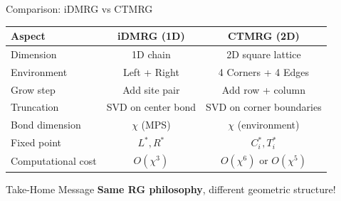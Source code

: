 \documentclass[aspectratio=169, 11pt]{beamer}
\newcommand{\goodpoint}[1]{\textcolor{accentgreen}{\textbf{#1}}}
\begin{document}

\begin{frame}{Comparison: iDMRG vs CTMRG}
	
	\begin{table}
		\centering
		\renewcommand{\arraystretch}{1.3}
		\begin{tabular}{l|c|c}
			\toprule
			\textbf{Aspect} & \textbf{iDMRG (1D)} & \textbf{CTMRG (2D)} \\
			\midrule
			Dimension & 1D chain & 2D square lattice \\
			\midrule
			Environment & Left + Right & 4 Corners + 4 Edges \\
			\midrule
			Grow step & Add site pair & Add row + column \\
			\midrule
			Truncation & SVD on center bond & SVD on corner boundaries \\
			\midrule
			Bond dimension & $\chi$ (MPS) & $\chi$ (environment) \\
			\midrule
			Fixed point & $L^*, R^*$ & $C_i^*, T_i^*$ \\
			\midrule
			Computational cost & $O(\chi^3)$ & $O(\chi^6)$ or $O(\chi^5)$ \\
			\bottomrule
		\end{tabular}
	\end{table}
	
	\vspace{0.3cm}
	
	\begin{block}{Take-Home Message}
		\goodpoint{Same RG philosophy}, different geometric structure!
	\end{block}
\end{frame}
\end{document}
